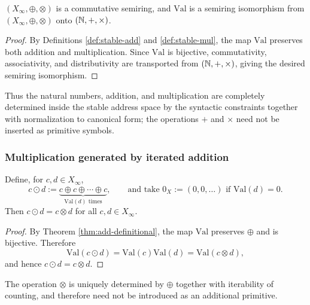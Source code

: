 \begin{theorem}\label{thm:mul-definitional}
\((X_\infty,\oplus,\otimes)\) is a commutative semiring, and \(\mathrm{Val}\) is a semiring isomorphism from \((X_\infty,\oplus,\otimes)\) onto \((\mathbb{N},+,\times)\).
\end{theorem}

\begin{proof}
By Definitions \ref{def:stable-add} and \ref{def:stable-mul}, the map \(\mathrm{Val}\) preserves both addition and multiplication. Since \(\mathrm{Val}\) is bijective, commutativity, associativity, and distributivity are transported from \((\mathbb{N},+,\times)\), giving the desired semiring isomorphism.
\end{proof}

Thus the natural numbers, addition, and multiplication are completely determined inside the stable address space by the syntactic constraints together with normalization to canonical form; the operations \(+\) and \(\times\) need not be inserted as primitive symbols.

\subsubsection{Multiplication generated by iterated addition}\label{subsec:mul-as-iterated-add}
\begin{theorem}\label{thm:mul-by-iterated-add}
Define, for \(c,d\in X_\infty\),
\[
c\odot d:=\underbrace{c\oplus c\oplus\cdots\oplus c}_{\mathrm{Val}(d)\text{ times}},
\qquad
\text{and take }0_X:=(0,0,\dots)\text{ if }\mathrm{Val}(d)=0.
\]
Then \(c\odot d=c\otimes d\) for all \(c,d\in X_\infty\).
\end{theorem}

\begin{proof}
By Theorem \ref{thm:add-definitional}, the map \(\mathrm{Val}\) preserves \(\oplus\) and is bijective. Therefore
\[
\mathrm{Val}(c\odot d)=\mathrm{Val}(c)\mathrm{Val}(d)=\mathrm{Val}(c\otimes d),
\]
and hence \(c\odot d=c\otimes d\).
\end{proof}

\begin{corollary}\label{cor:mul-no-new-primitive}
The operation \(\otimes\) is uniquely determined by \(\oplus\) together with iterability of counting, and therefore need not be introduced as an additional primitive.
\end{corollary}

